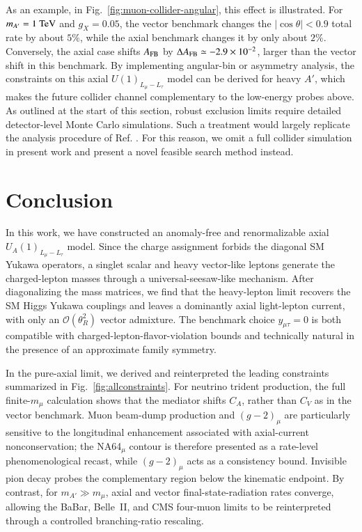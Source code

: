 \documentclass[onecolumn, aps, nofootinbib, prd, preprint, floats, floatfix, amsmath, amssymb, superscriptaddress, preprintnumbers]{revtex4-1}
\newcommand{\zb}[1]{{\color{blue} {#1}}}
\begin{document}
As an example, in Fig.~\ref{fig:muon-collider-angular}, this effect is illustrated. For $m_{A'}=1~{\rm TeV}$ and $g_X=0.05$, the vector benchmark changes the $|\cos\theta|<0.9$ total rate by about $5\%$, while the axial benchmark changes it by only about $2\%$. Conversely, the axial case shifts $A_{\rm FB}$ by $\Delta A_{\rm FB}\simeq-2.9\times10^{-2}$, larger than the vector shift in this benchmark. By implementing angular-bin or asymmetry analysis, the constraints on this axial $U(1)_{L_\mu-L_\tau}$ model can be derived for heavy $A'$, which makes the future collider channel complementary to the low-energy probes above. As outlined at the start of this section, robust exclusion limits require detailed detector-level Monte Carlo simulations. Such a treatment would largely replicate the analysis procedure of Ref. \cite{Huang:2021nkl}. For this reason, we omit a full collider simulation in present work and present a novel feasible search method instead.


\section{Conclusion}
\label{sec:conclusion}

In this work, we have constructed an anomaly-free and renormalizable axial $U_A(1)_{L_\mu-L_\tau}$ model. Since the charge assignment forbids the diagonal SM Yukawa operators, a singlet scalar and heavy vector-like leptons generate the charged-lepton masses through a universal-seesaw-like mechanism. After diagonalizing the mass matrices, we find that the heavy-lepton limit recovers the SM Higgs Yukawa couplings and leaves a dominantly axial light-lepton current, with only an $\mathcal O(\theta_R^2)$ vector admixture. The benchmark choice $y_{\mu\tau}=0$ is both compatible with charged-lepton-flavor-violation bounds and technically natural in the presence of an approximate family symmetry.
\zb{}

In the pure-axial limit, we derived and reinterpreted the leading constraints summarized in Fig.~\ref{fig:allconstraints}. For neutrino trident production, the full finite-$m_\mu$ calculation shows that the mediator shifts $C_A$, rather than $C_V$ as in the vector benchmark. Muon beam-dump production and $(g-2)_\mu$ are particularly sensitive to the longitudinal enhancement associated with axial-current nonconservation; the NA64$_\mu$ contour is therefore presented as a rate-level phenomenological recast, while $(g-2)_\mu$ acts as a consistency bound. Invisible pion decay probes the complementary region below the kinematic endpoint. By contrast, for $m_{A'}\gg m_\mu$, axial and vector final-state-radiation rates converge, allowing the BaBar, Belle~II, and CMS four-muon limits to be reinterpreted through a controlled branching-ratio rescaling.
\end{document}
